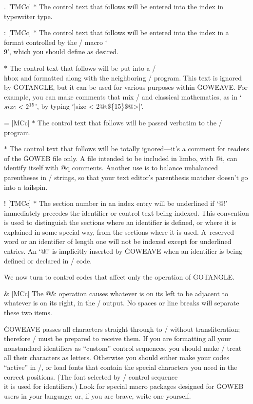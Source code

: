 \@. [TMCc] $*$ The control text that follows will be entered into the index
in \.{typewriter} \.{type}.

\@: [TMCc] $*$ The control text that follows will be entered into the index
in a format controlled by the \TEX/ macro `\.{\\9}', which you
should define as desired.

\@t [MCc] $*$ The control text that follows will
be put into a \TEX/ \.{\\hbox} and formatted along with the neighboring
\GO/ program. This text is ignored by \.{GOTANGLE}, but it can be used
for various purposes within \.{GOWEAVE}. For example, you can make comments
that mix \GO/ and classical mathematics, as in `$\\{size}<2^{15}$', by
typing `\.{|size < 2@t\$\^\{15\}\$@>|}'.

\@= [MCc] $*$ The control text that follows will
be passed verbatim to the \GO/ program.

\@q [LTMCc] $*$ The control text that follows will
be totally ignored---it's a comment for readers of the \.{GOWEB} file only.
A file intended to be included in
limbo, with \.{@i}, can identify itself with \.{@q} comments.
Another use is to balance unbalanced parentheses in \GO/ strings,
so that your text editor's parenthesis matcher doesn't go into a tailspin.

\@! [TMCc] $*$
The section number in an index entry will be underlined if `\.{@!}'
immediately precedes the identifier or control text being indexed. This
convention is used to distinguish the sections where an identifier is
defined, or where it is explained in some special way, from the sections
where it is used. A~reserved word or an identifier of length one will not
be indexed except for underlined entries. An `\.{@!}' is implicitly inserted
by \.{GOWEAVE} when an identifier is being defined or declared in \GO/
code.

\subsec
We now turn to control codes that affect only the operation of
\.{GOTANGLE}.

\@\& [MCc] The \.{@\&} operation causes whatever is on its left to be
adjacent to whatever is on its right, in the \GO/ output. No spaces or
line breaks will separate these two items.

\more
\.{GOWEAVE} passes all characters straight through to \TEX/ without
transliteration; therefore \TEX/ must be prepared to receive them.
If you are formatting all your nonstandard identifiers as ``custom''
control sequences, you should
make \TEX/ treat all their characters as letters. Otherwise you should either
make your codes ``active'' in \TEX/, or load fonts that
contain the special characters you need in the correct positions.
(The font selected by \TEX/ control sequence \.{\\it} is used for
identifiers.)
Look for special macro packages designed for \.{GOWEB} users in your language;
or, if you are brave, write one yourself.

